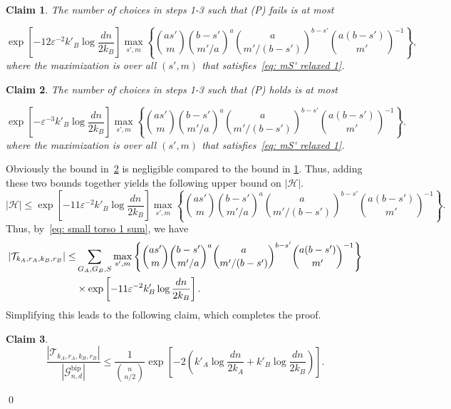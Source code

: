 \documentclass[11pt]{article}
\newcommand{\eps}{\varepsilon}
\newcommand{\jc}[1]{{\color{blue}[Jane: #1]}}
\theoremstyle{plain}
\newtheorem{claim}{Claim}[thm]
\begin{document}
    \begin{claim}\label{clm: P fails}
        The number of choices in steps 1-3 such that (P) fails is at most

\[
        \exp\left[-12\eps^{-2}k'_B\log\frac{dn}{2k_B}\right]\max_{s', m}\left\{ \binom{as'}{m}\binom{b - s'}{m'/a}^a\binom{a}{m'/(b - s')}^{b-s'}\binom{a(b - s')}{m'}^{-1} \right\},
        \]
where the maximization is over all $(s',m)$ that satisfies~\eqref{eq: mS' relaxed 1}.
        
    \end{claim}


    \begin{claim}\label{clm: P holds}
        The number of choices in steps 1-3 such that (P) holds is at most 


\[
        \exp\left[-\eps^{-3}k'_B\log\frac{dn}{2k_B}\right]\max_{s', m}\left\{ \binom{as'}{m}\binom{b - s'}{m'/a}^a\binom{a}{m'/(b - s')}^{b-s'}\binom{a(b - s')}{m'}^{-1} \right\}.
        \]
where the maximization is over all $(s',m)$ that satisfies~\eqref{eq: mS' relaxed 1}.
        
    
    \end{claim}

    Obviously the bound in~\cref{clm: P holds} is negligible compared to the bound in \newline\cref{clm: P fails}. Thus, adding these two bounds together yields the following upper bound on $|\mathcal H|$.
    \begin{equation}
        |\mathcal H| \leq \exp\left[-11\eps^{-2}k'_B\log\frac{dn}{2k_B}\right]\max_{s', m}\left\{ \binom{as'}{m}\binom{b - s'}{m'/a}^a\binom{a}{m'/(b - s')}^{b-s'}\binom{a(b - s')}{m'}^{-1} \right\}.
    \end{equation}
    Thus, by~\eqref{eq: small torso 1 sum}, we have 
    \begin{align}
    |\mathcal T_{k_A, r_A, k_B, r_B}| \leq& \sum_{G_A, G_B, S}\max_{s', m}\left\{ \binom{as'}{m}\binom{b - s'}{m'/a}^a\binom{a}{m'/(b - s')}^{b-s'}\binom{a(b - s')}{m'}^{-1} \right\}\notag\\
    &\times \exp\left[-11\eps^{-2}k'_B\log\frac{dn}{2k_B}\right].\label{eq: small torso 1 T}
    \end{align}
    Simplifying this leads to the following claim, which completes the proof.
    \begin{claim}\label{clm: small torso final 1}
        \[
        \frac{|\mathcal T_{k_A, r_A, k_B, r_B}|}{|\mathcal G_{n,d}^\text{bip}|}\leq\frac{1}{\binom{n}{n/2}}\exp\left[ -2\left( k'_A\log\frac{dn}{2k_A} + k'_B\log\frac{dn}{2k_B}\right) \right].
        \]
    \end{claim}
\qed
\end{document}

